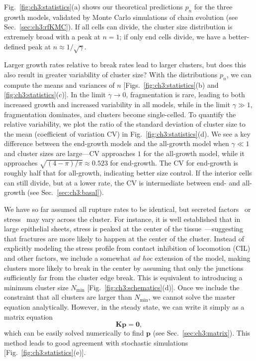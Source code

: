 Fig.~\ref{fig:ch3:statistics}(a) shows our theoretical predictions $p_n$ for the three growth models, validated by Monte Carlo simulations of chain evolution (see Sec.~\ref{sec:ch3:rfKMC}). If all cells can divide, the cluster size distribution is extremely broad with a peak at $n = 1$; if only end cells divide, we have a better-defined peak at $n \approx 1/\sqrt{\gamma}$.

Larger growth rates relative to break rates lead to larger clusters, but does this also result in greater variability of cluster size? With the distributions $p_n$, we can compute the means and variances of $n$ [Figs.~\ref{fig:ch3:statistics}(b) and \ref{fig:ch3:statistics}(c)]. In the limit $\gamma\to 0$, fragmentation is rare, leading to both increased growth and increased variability in all models, while in the limit $\gamma \gg 1$, fragmentation dominates, and clusters become single-celled. To quantify the relative variability, we plot the ratio of the standard deviation of cluster size to the mean (coefficient of variation $\mathrm{CV}$) in Fig.~\ref{fig:ch3:statistics}(d). We see a key difference between the end-growth models and the all-growth model when $\gamma\ll 1$ and cluster sizes are large---$\mathrm{CV}$ approaches $1$ for the all-growth model, while it approaches $\sqrt{(4-\pi)/\pi}\approx 0.523$ for end-growth. The $\mathrm{CV}$ for end-growth is roughly half that for all-growth, indicating better size control. If the interior cells can still divide, but at a lower rate, the $\mathrm{CV}$ is intermediate between end- and all-growth (see Sec.~\ref{sec:ch3:basal}).

We have so far assumed all rupture rates to be identical, but secreted factors~\cite{vennettilli2022autologous} or stress~\cite{trepat2009physical} may vary across the cluster. For instance, it is well established that in large epithelial sheets, stress is peaked at the center of the tissue~\cite{trepat2009physical}---suggesting that fractures are more likely to happen at the center of the cluster. Instead of explicitly modeling the stress profile from contact inhibition of locomotion (CIL)~\cite{zimmermann2016contact} and other factors, we include a somewhat \textit{ad hoc} extension of the model, making clusters more likely to break in the center by assuming that only the junctions sufficiently far from the cluster edge break. This is equivalent to introducing a minimum cluster size $N_\textrm{min}$ [Fig.~\ref{fig:ch3:schematics}(d)]. Once we include the constraint that all clusters are larger than $N_\textrm{min}$, we cannot solve the master equation analytically. However, in the steady state, we can write it simply as a matrix equation
\begin{equation}
    \bm{K}\mathbf{p}=\mathbf{0},
\end{equation}
which can be easily solved numerically to find $\mathbf{p}$ (see Sec.~\ref{sec:ch3:matrix}). This method leads to good agreement with stochastic simulations [Fig.~\ref{fig:ch3:statistics}(e)].

